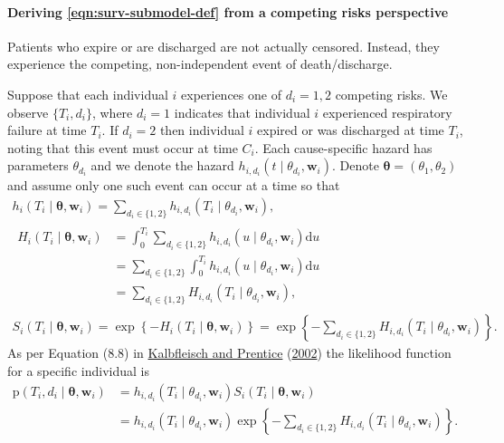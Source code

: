 \documentclass[
  10pt,
  a4paper,
]{article}
\newcommand{\pd}{\text{p}}
\begin{document}
\hypertarget{deriving-from-a-competing-risks-perspective}{%
\paragraph{\texorpdfstring{Deriving \eqref{eqn:surv-submodel-def} from a
competing risks
perspective}{Deriving  from a competing risks perspective}}\label{deriving-from-a-competing-risks-perspective}}

Patients who expire or are discharged are not actually censored.
Instead, they experience the competing, non-independent event of
death/discharge.

Suppose that each individual \(i\) experiences one of \(d_{i} = 1, 2\)
competing risks. We observe \(\{T_{i}, d_{i}\}\), where \(d_{i} = 1\)
indicates that individual \(i\) experienced respiratory failure at time
\(T_{i}\). If \(d_{i} = 2\) then individual \(i\) expired or was
discharged at time \(T_{i}\), noting that this event must occur at time
\(C_{i}\). Each cause-specific hazard has parameters \(\theta_{d_{i}}\)
and we denote the hazard
\(h_{i, d_{i}}(t \mid \theta_{d_{i}}, \boldsymbol{w}_{i})\). Denote
\(\boldsymbol{\theta} = (\theta_{1}, \theta_{2})\) and assume only one
such event can occur at a time so that \begin{gather}
  h_{i}(T_{i} \mid \boldsymbol{\theta}, \boldsymbol{w}_{i}) = \sum_{d_{i} \in \{1, 2\}} h_{i, d_{i}}(T_{i} \mid \theta_{d_{i}}, \boldsymbol{w}_{i}), \\
  \begin{aligned}
  H_{i}(T_{i} \mid \boldsymbol{\theta}, \boldsymbol{w}_{i})
    &= \int_{0}^{T_{i}} \sum_{d_{i} \in \{1, 2\}} h_{i, d_{i}}(u \mid \theta_{d_{i}}, \boldsymbol{w}_{i}) \text{d}u \\
    &= \sum_{d_{i} \in \{1, 2\}} \int_{0}^{T_{i}} h_{i, d_{i}}(u \mid \theta_{d_{i}}, \boldsymbol{w}_{i}) \text{d}u \\
    &= \sum_{d_{i} \in \{1, 2\}} H_{i, d_{i}}(T_{i} \mid \theta_{d_{i}}, \boldsymbol{w}_{i}),
  \end{aligned} \\
  S_{i}(T_{i} \mid \boldsymbol{\theta}, \boldsymbol{w}_{i})
    = \exp\left\{-H_{i}(T_{i} \mid \boldsymbol{\theta}, \boldsymbol{w}_{i})\right\}
    = \exp\left\{-\sum_{d_{i} \in \{1, 2\}} H_{i, d_{i}}(T_{i} \mid \theta_{d_{i}}, \boldsymbol{w}_{i})\right\}.
\end{gather} As per Equation (8.8) in
\protect\hyperlink{ref-kalbfleisch_statistical_2002}{Kalbfleisch and
Prentice} (\protect\hyperlink{ref-kalbfleisch_statistical_2002}{2002})
the likelihood function for a specific individual is \begin{align*}
  \pd(T_{i}, d_{i} \mid \boldsymbol{\theta}, \boldsymbol{w}_{i})
    &= h_{i, d_{i}}(T_{i} \mid \theta_{d_{i}}, \boldsymbol{w}_{i}) S_{i}(T_{i} \mid \boldsymbol{\theta}, \boldsymbol{w}_{i}) \\
    &= h_{i, d_{i}}(T_{i} \mid \theta_{d_{i}}, \boldsymbol{w}_{i}) \exp\left\{-\sum_{d_{i} \in \{1, 2\}} H_{i, d_{i}}(T_{i} \mid \theta_{d_{i}}, \boldsymbol{w}_{i})\right\}.
\end{align*}
\end{document}
